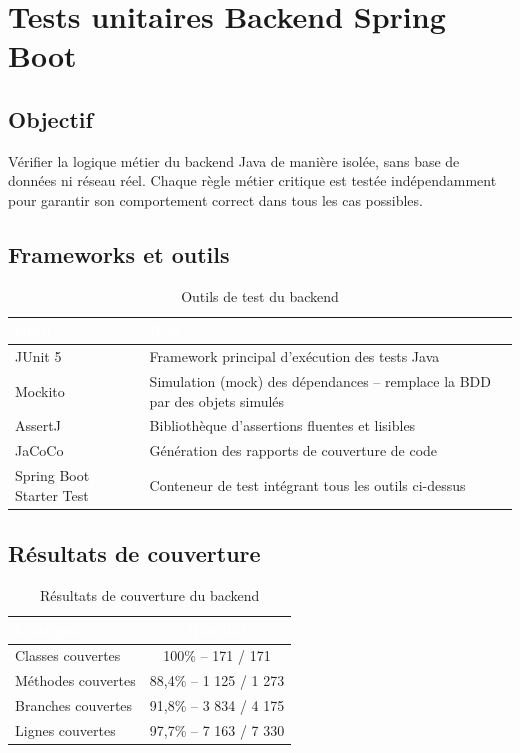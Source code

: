 \documentclass[12pt,a4paper]{report}
\newcommand{\thead}[1]{\cellcolor{tablehead}\textcolor{white}{\textbf{#1}}}
\begin{document}
\section{Tests unitaires Backend Spring Boot}
\label{sec:ch9-backend}

\subsection{Objectif}

Vérifier la logique métier du backend Java de manière isolée, sans base
de données ni réseau réel. Chaque règle métier critique est testée
indépendamment pour garantir son comportement correct dans tous les cas
possibles.

\subsection{Frameworks et outils}

\begin{table}[H]
  \centering
  \caption{Outils de test du backend}
  \label{tab:tests_outils_backend}
  \begin{tabularx}{\textwidth}{|l|Y|}
    \hline
    \thead{Outil} & \thead{Rôle} \\
    \hline
    JUnit 5 & Framework principal d'exécution des tests Java \\
    Mockito & Simulation (mock) des dépendances -- remplace la BDD par des objets simulés \\
    AssertJ & Bibliothèque d'assertions fluentes et lisibles \\
    JaCoCo & Génération des rapports de couverture de code \\
    Spring Boot Starter Test & Conteneur de test intégrant tous les outils ci-dessus \\
    \hline
  \end{tabularx}
\end{table}

\subsection{Résultats de couverture}

\begin{table}[H]
  \centering
  \caption{Résultats de couverture du backend}
  \label{tab:tests_couv_backend}
  \begin{tabularx}{\textwidth}{|l|c|}
    \hline
    \thead{Métrique} & \thead{Résultat} \\
    \hline
    Classes couvertes & 100\% -- 171 / 171 \\
    Méthodes couvertes & 88,4\% -- 1 125 / 1 273 \\
    Branches couvertes & 91,8\% -- 3 834 / 4 175 \\
    Lignes couvertes & 97,7\% -- 7 163 / 7 330 \\
    \hline
  \end{tabularx}
\end{table}
\end{document}
